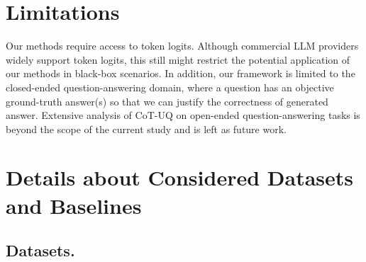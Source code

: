 \documentclass[11pt]{article}
\begin{document}
\section*{Limitations}
Our methods require access to token logits. Although commercial LLM providers widely support token logits, this still might restrict the potential application of our methods in black-box scenarios.
In addition, our framework is limited to the closed-ended question-answering domain, where a question has an objective ground-truth answer(s) so that we can justify the correctness of generated answer. Extensive analysis of CoT-UQ on open-ended question-answering tasks is beyond the scope of the current study and is left as future work.



\clearpage
\appendix

\section{Details about Considered Datasets and Baselines}
\label{app:details}

\subsection{Datasets.}
\label{app:details:data}
\end{document}
